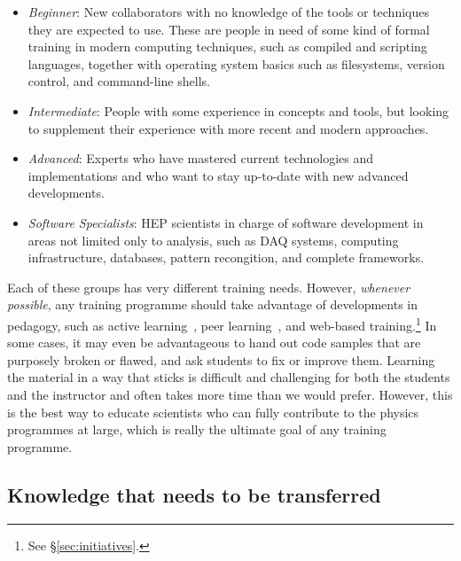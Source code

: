 \documentclass[12pt,a4paper]{article}
\begin{document}
\begin{itemize}
   \item \emph{Beginner}: New collaborators with no knowledge of the 
   tools or techniques they are expected to use. These are people in need of some kind of formal 
   training in modern computing techniques, such as compiled and scripting 
   languages, together with operating system basics such as filesystems, version 
   control, and command-line shells.
   \item \emph{Intermediate}: People with some experience in 
   concepts and tools, but looking to supplement their 
   experience with more recent and modern approaches. 
   \item \emph{Advanced}: Experts who have mastered current 
   technologies and implementations and who want to stay up-to-date with 
   new advanced developments.
   \item \emph{Software Specialists}: HEP scientists in charge of software 
   development in areas not limited only to analysis, such as DAQ systems, 
   computing infrastructure, databases, pattern recongition, and complete 
   frameworks.
\end{itemize}

Each of these groups has very different training needs. However,
\emph{whenever possible}, any training programme should take advantage of
developments in pedagogy, such as active
learning~\cite{ActiveLearning}, peer learning~\cite{PeerLearning}, and
web-based training.\footnote{See \S\ref{sec:initiatives}.} In some cases, it may
even be advantageous to hand out code samples that are purposely broken or
flawed, and ask students to fix or improve them. Learning the material in a way
that sticks is difficult and challenging for both the students
and the instructor and often takes more time than we would prefer. However, this
is the best way to educate scientists who can fully
contribute to the physics programmes at large, which is really the ultimate goal
of any training programme.

\subsection{Knowledge that needs to be transferred}
\end{document}
